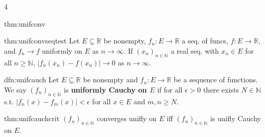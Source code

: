 \documentclass[landscape, 8pt]{extarticle}
\begin{document}
\begin{multicols*}{4}
\begin{mthm}{thm:unifconv}{ }
		\end{mthm}
		
		
		\begin{thm}{thm:unifconvseqtest}{ }
		Let $E \subseteq \mathbb{R}$ be nonempty, $f_n:E \to \mathbb{R}$ a seq. of funcs, $f: E \to \mathbb{R}$, and $f_n \to f$ uniformly on $E$ as $n \to \infty$. If $(x_n)_{n\in \mathbb{N}}$ a real seq. with $x_n\in E$ for all $n \ge \mathbb{N}$, $\left|f_n(x_n) - f(x_n)\right| \to 0$ as $n \to \infty$.
		
		\end{thm}
		
		
		
		\begin{dfn}{dfn:unifcauch}{ }
		Let $E \subseteq \mathbb{R}$ be nonempty and $f_n : E \to \mathbb{R}$ be a sequence of functions. We say $(f_n)_{n\in \mathbb{N}}$ is \textbf{uniformly Cauchy on $E$} if for all $\epsilon > 0$ there exists $N\in \mathbb{N}$ s.t. $\left|f_n(x) - f_m(x)\right| < \epsilon$ for all $x\in E$ and $m, n \ge N$.
		
		\end{dfn}
		
		
		\begin{mthm}{thm:unifcauchcrit}{ }
		$(f_n)_{n\in \mathbb{N}}$ converges unifly on $E$ iff $(f_n)_{n\in \mathbb{N}}$ is unifly Cauchy on $E$.
		
		\end{mthm}
		

\end{multicols*}
\end{document}
